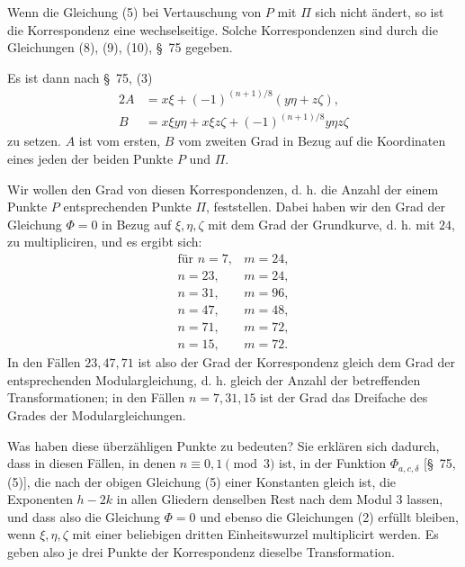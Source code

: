 \documentclass[11pt]{article}
\begin{document}
Wenn die Gleichung (5) bei Vertauschung von $P$ mit $\Pi$ sich nicht ändert, so ist die Korrespondenz eine wechselseitige. Solche Korrespondenzen sind durch die Gleichungen (8), (9), (10), \S~75 gegeben.

Es ist dann nach \S~75, (3)
\begin{equation}
\begin{aligned}
2A&=x\xi+(-1)^{(n+1)/8}(y\eta+z\zeta),\\
B&=x\xi y\eta+x\xi z\zeta+(-1)^{(n+1)/8}y\eta z\zeta
\end{aligned}
\tag{5}
\end{equation}
zu setzen. $A$ ist vom ersten, $B$ vom zweiten Grad in Bezug auf die Koordinaten eines jeden der beiden Punkte $P$ und $\Pi$.

Wir wollen den Grad von diesen Korrespondenzen, d. h. die Anzahl der einem Punkte $P$ entsprechenden Punkte $\Pi$, feststellen. Dabei haben wir den Grad der Gleichung $\Phi=0$ in Bezug auf $\xi,\eta,\zeta$ mit dem Grad der Grundkurve, d. h. mit $24$, zu multipliciren, und es ergibt sich:
\[
\begin{array}{c|c}
\text{für } n=7,&m=24,\\
 n=23,&m=24,\\
 n=31,&m=96,\\
 n=47,&m=48,\\
 n=71,&m=72,\\
 n=15,&m=72.
\end{array}
\]
In den Fällen $23,47,71$ ist also der Grad der Korrespondenz gleich dem Grad der entsprechenden Modulargleichung, d. h. gleich der Anzahl der betreffenden Transformationen; in den Fällen $n=7,31,15$ ist der Grad das Dreifache des Grades der Modulargleichungen.

Was haben diese überzähligen Punkte zu bedeuten? Sie erklären sich dadurch, dass in diesen Fällen, in denen $n\equiv0,1\pmod 3$ ist, in der Funktion $\Phi_{a,c,\delta}$ [\S~75, (5)], die nach der obigen Gleichung (5) einer Konstanten gleich ist, die Exponenten $h-2k$ in allen Gliedern denselben Rest nach dem Modul $3$ lassen, und dass also die Gleichung $\Phi=0$ und ebenso die Gleichungen (2) erfüllt bleiben, wenn $\xi,\eta,\zeta$ mit einer beliebigen dritten Einheitswurzel multiplicirt werden. Es geben also je drei Punkte der Korrespondenz dieselbe Transformation.
\end{document}
